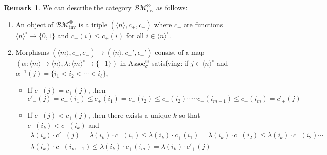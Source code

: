 \documentclass{article}
\newcommand{\Associnv}{\mathrm{Assoc}_\sigma}
\theoremstyle{definition}
\newtheorem{remark}[theorem]{Remark}
\begin{document}
\begin{remark}
    We can describe the category $ \mathcal{BM}_\mathrm{inv}^\otimes $ as follows: 
    \begin{enumerate}[label=(\arabic*)]
        \item An object of $ \mathcal{BM}_\mathrm{inv}^\otimes $ is a triple $ (\langle n\rangle,c_+, c_{-}) $ where $ c_{\pm} $ are functions $ \langle n \rangle^\circ \to \{0,1\} $ and $ c_{-}(i) \leq c_{+}(i) $ for all $ i \in \langle n \rangle^\circ $. 
        \item Morphisms $ (\langle m \rangle, c_+, c_{-}) \to (\langle n \rangle, c_{+}', c_{-}') $ consist of a map $ (\alpha \colon \langle m \rangle \to \langle n \rangle, \lambda \colon \langle m \rangle^\circ \to \{\pm 1\}) $ in $ \Associnv^\otimes $ satisfying: if $ j \in \langle n \rangle^\circ $ and $ \alpha^{-1}(j) = \{i_1 < i_2 < \cdots < i_\ell\} $,
        \begin{itemize}
             \item If $ c_{-} (j) = c_+(j) $, then 
                \begin{equation*}
                    c'_{-}(j) = c_{-}(i_1) \leq c_{+}(i_1) = c_{-}(i_2) \leq c_{+}(i_2) \cdots \cdots c_{-}(i_{m-1}) \leq c_{+}(i_m) = c'_{+}(j)
                \end{equation*}
            \item If $ c_{-} (j) < c_+(j) $, then there exists a unique $ k $ so that $ c_{-}(i_k) < c_{+}(i_k) $ and 
                \begin{equation*}
                \begin{split}
                    \lambda(i_k) \cdot c'_{-}(j) = \lambda(i_k) \cdot c_{-}(i_1) \leq \lambda(i_k) \cdot c_{+}(i_1) = \lambda(i_k) \cdot c_{-}(i_2) \leq \lambda(i_k) \cdot c_{+}(i_2)  \cdots \\ \lambda(i_k) \cdot c_{-}(i_{m-1}) \leq \lambda(i_k) \cdot c_{+}(i_m) = \lambda(i_k) \cdot c'_{+}(j)           
                \end{split}
                \end{equation*}
         \end{itemize} 
    \end{enumerate}
\end{remark}
\end{document}

